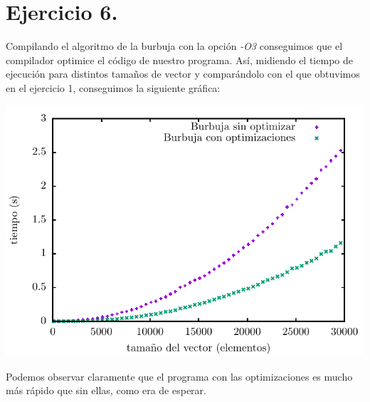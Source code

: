 \documentclass[11pt,a4paper]{article}
\begin{document}
\section*{Ejercicio 6.}

Compilando el algoritmo de la burbuja con la opción \textit{-O3} conseguimos que el compilador optimice el código de nuestro programa. Así, midiendo el tiempo de ejecución para distintos tamaños de vector y comparándolo con el que obtuvimos en el ejercicio 1, conseguimos la siguiente gráfica:

\begin{center}
	\includegraphics{img/tiempos_burbuja_opt_compilador.pdf}
\end{center}

Podemos observar claramente que el programa con las optimizaciones es mucho más rápido que sin ellas, como era de esperar.
\end{document}

